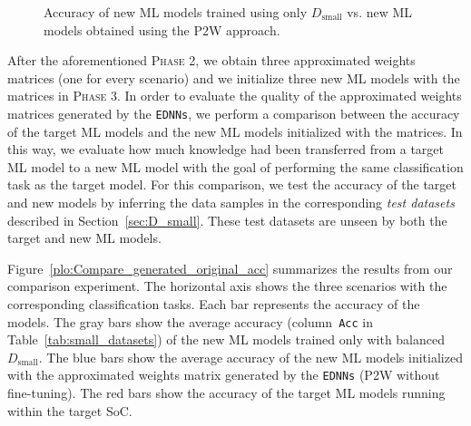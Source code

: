 \documentclass[letterpaper]{article}
\begin{document}
\begin{figure}[!t]
    \caption{Accuracy of new ML models trained using only $D_\text{small}$ vs. new ML models obtained using the P2W approach.}
    \label{fig:acuracy_overfitting_12}
\end{figure}

After the aforementioned \textsc{Phase 2}, we obtain three approximated weights matrices (one for every scenario) and we initialize three new ML models with the matrices in \textsc{Phase 3}. In order to evaluate the quality of the approximated weights matrices generated by the \texttt{EDNNs}, we perform a comparison between the accuracy of the target ML models and the new ML models initialized with the matrices. In this way, we evaluate how much knowledge had been transferred from a target ML model to a new ML model with the goal of performing the same classification task as the target model. For this comparison, we test the accuracy of the target and new models by inferring the data samples in the corresponding \emph{test datasets} described in Section~\ref{sec:D_small}. These test datasets are unseen by both the target and new ML models. 



Figure~\ref{plo:Compare_generated_original_acc} summarizes the results from our comparison experiment. The horizontal axis shows the three scenarios with the corresponding classification tasks. Each bar represents the accuracy of the models. The gray bars show the average accuracy (column~\texttt{Acc} in Table~\ref{tab:small_datasets}) of the new ML models trained only with balanced $D_{\text{small}}$. The blue bars show the average accuracy of the new ML models initialized with the approximated weights matrix generated by the \texttt{EDNNs} (P2W without fine-tuning). 
The red bars show the accuracy of the target ML models running within the target SoC.
\end{document}
